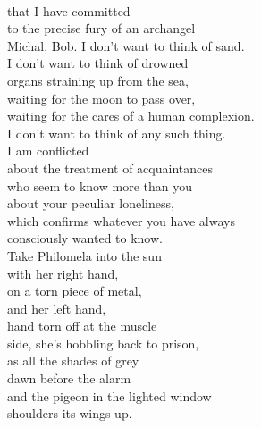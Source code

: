 \documentclass[smalldemyvopaper,11pt,twoside,onecolumn,openright,extrafontsizes]{memoir}
\begin{document}
\\that I have committed
\\to the precise fury of an archangel
\\Michal, Bob. I don't want to think of sand.
\\I don't want to think of drowned
\\organs straining up from the sea,
\\waiting for the moon to pass over,
\\waiting for the cares of a human complexion.
\\I don't want to think of any such thing.
\\I am conflicted
\\about the treatment of acquaintances
\\who seem to know more than you
\\about your peculiar loneliness,
\\which confirms whatever you have always
\\consciously wanted to know.
\\Take Philomela into the sun
\\with her right hand,
\\on a torn piece of metal,
\\and her left hand,
\\hand torn off at the muscle
\\side, she's hobbling back to prison,
\\as all the shades of grey
\\dawn before the alarm
\\and the pigeon in the lighted window
\\shoulders its wings up.
\end{document}
